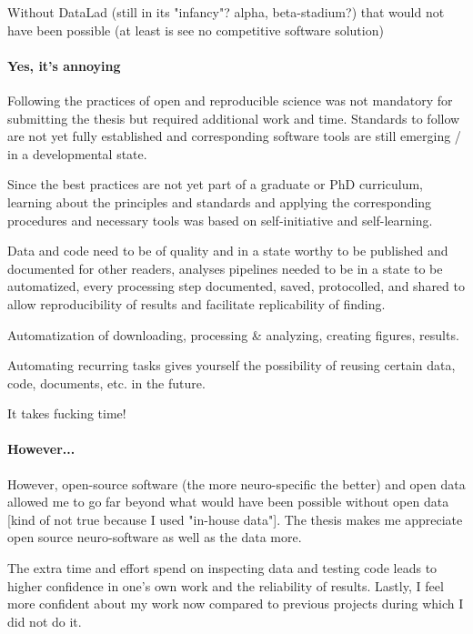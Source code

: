 %
Without DataLad (still in its "infancy"? alpha, beta-stadium?) that would not
have been possible (at least is see no competitive software solution)


\paragraph{Yes, it's annoying}

%
Following the practices of open and reproducible science was not mandatory for
submitting the thesis but required additional work and time.
%
Standards to follow are not yet fully established and corresponding software
tools are still emerging / in a developmental state.

%
Since the best practices are not yet part of a graduate or PhD curriculum,
learning about the principles and standards and applying the corresponding
procedures and necessary tools was based on self-initiative and self-learning.

Data and code need to be of quality and in a state worthy to be published and
documented for other readers, analyses pipelines needed to be in a state to be
automatized, every processing step documented, saved, protocolled, and shared to
allow reproducibility of results and facilitate replicability of finding.

%
Automatization of downloading, processing \& analyzing, creating figures,
results.

%
Automating recurring tasks gives yourself the possibility of reusing
certain data, code, documents, etc. in the future.


%
It takes fucking time!


\paragraph{However...}

%
However, open-source software (the more neuro-specific the better) and open data
allowed me to go far beyond what would have been possible without open
data [kind of not true because I used "in-house data"].
%
The thesis makes me appreciate open source neuro-software as well as the data
more.

%
The extra time and effort spend on inspecting data and testing code
leads to higher confidence in one's own work and the reliability of results.
%
Lastly, I feel more confident about my work now compared to previous projects
during which I did not do it.




